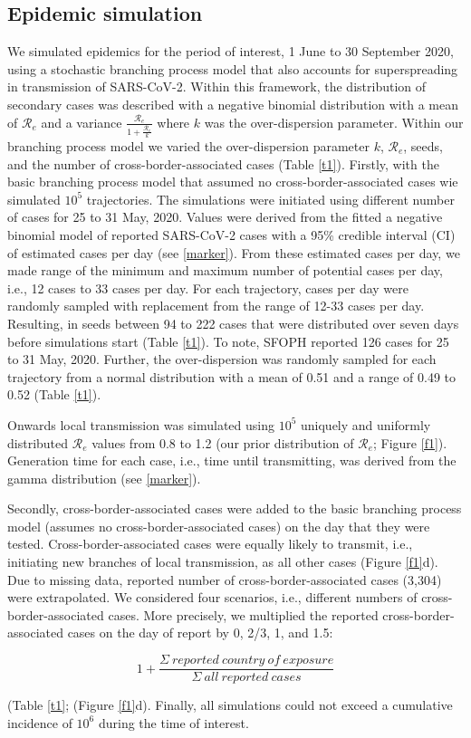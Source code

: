 \documentclass[10pt, a4paper, twoside]{article}
\begin{document}
\begin{multicols}{2}
\subsection{Epidemic simulation}
We simulated epidemics for the period of interest, 1 June to 30 September 2020, using a stochastic branching process model that also accounts for superspreading in transmission of SARS-CoV-2.
Within this framework, the distribution of secondary cases was described with a negative binomial distribution with a mean of $\mathcal{R}_e$ and a variance $\frac{\mathcal{R}_e}{1+\frac{\mathcal{R}_e}{k}}$ where $k$ was the over-dispersion parameter.
Within our branching process model we varied the over-dispersion parameter $k$, $\mathcal{R}_e$, seeds, and the number of cross-border-associated cases (Table \ref{t1}).
Firstly, with the basic branching process model that assumed no cross-border-associated cases wie simulated $10^5$ trajectories.
The simulations were initiated using different number of cases for 25 to 31 May, 2020.
Values were derived from the fitted a negative binomial model of reported SARS-CoV-2 cases with a 95\% credible interval (CI) of estimated cases per day (see \ref{marker}).
From these estimated cases per day, we made range of the minimum and maximum number of potential cases per day, i.e., 12 cases to 33 cases per day. 
For each trajectory, cases per day were randomly sampled with replacement from the range of 12-33 cases per day.
Resulting, in seeds between 94 to 222 cases that were distributed over seven days before simulations start (Table \ref{t1}).
To note, SFOPH reported 126 cases for 25 to 31 May, 2020.
Further, the over-dispersion was randomly sampled for each trajectory from a normal distribution with a mean of 0.51 and a range of 0.49 to 0.52 (Table \ref{t1}).\cite{laxminarayan_epidemiology_2020}

Onwards local transmission was simulated using $10^5$ uniquely and uniformly distributed $\mathcal{R}_e$ values from 0.8 to 1.2 (our prior distribution of $\mathcal{R}_e$; Figure \ref{f1}).
Generation time for each case, i.e., time until transmitting, was derived from the gamma distribution (see \ref{marker}).

Secondly, cross-border-associated cases were added to the basic branching process model (assumes no cross-border-associated cases) on the day that they were tested.
Cross-border-associated cases were equally likely to transmit, i.e., initiating new branches of local transmission, as all other cases (Figure \ref{f1}d).
Due to missing data, reported number of cross-border-associated cases (3,304) were extrapolated.
We considered four scenarios, i.e., different numbers of cross-border-associated cases.
More precisely, we multiplied the reported cross-border-associated cases on the day of report by 0, 2/3, 1, and 1.5:
\begin{small} \[ 1+ {\frac{\Sigma~reported ~country ~of ~exposure }{\Sigma~all ~reported ~cases}}\] \end{small} (Table \ref{t1}; (Figure \ref{f1}d).
Finally, all simulations could not exceed a cumulative incidence of $10^6$ during the time of interest.


\end{multicols}
\end{document}
